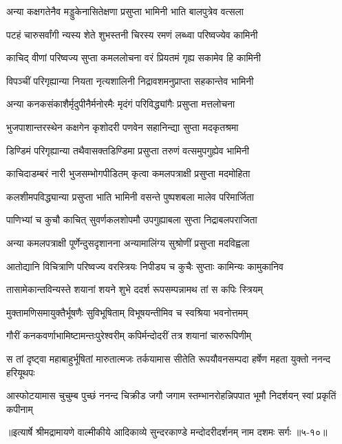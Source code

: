 \twolineshloka
{अन्या कक्षगतेनैव मड्डुकेनासितेक्षणा}
{प्रसुप्ता भामिनी भाति बालपुत्रेव वत्सला} %

\twolineshloka
{पटहं चारुसर्वांगी न्यस्य शेते शुभस्तनी}
{चिरस्य रमणं लब्ध्वा परिष्वज्येव कामिनी} %

\twolineshloka
{काचिद् वीणां परिष्वज्य सुप्ता कमललोचना}
{वरं प्रियतमं गृह्य सकामेव हि कामिनी} %

\twolineshloka
{विपञ्चीं परिगृह्यान्या नियता नृत्यशालिनी}
{निद्रावशमनुप्राप्ता सहकान्तेव भामिनी} %

\twolineshloka
{अन्या कनकसंकाशैर्मृदुपीनैर्मनोरमैः}
{मृदंगं परिविद्ध्यांगैः प्रसुप्ता मत्तलोचना} %

\twolineshloka
{भुजपाशान्तरस्थेन कक्षगेन कृशोदरी}
{पणवेन सहानिन्द्या सुप्ता मदकृतश्रमा} %

\twolineshloka
{डिण्डिमं परिगृह्यान्या तथैवासक्तडिण्डिमा}
{प्रसुप्ता तरुणं वत्समुपगुह्येव भामिनी} %

\twolineshloka
{काचिदाडम्बरं नारी भुजसम्भोगपीडितम्}
{कृत्वा कमलपत्राक्षी प्रसुप्ता मदमोहिता} %

\twolineshloka
{कलशीमपविद्ध्यान्या प्रसुप्ता भाति भामिनी}
{वसन्ते पुष्पशबला मालेव परिमार्जिता} %

\twolineshloka
{पाणिभ्यां च कुचौ काचित् सुवर्णकलशोपमौ}
{उपगुह्याबला सुप्ता निद्राबलपराजिता} %

\twolineshloka
{अन्या कमलपत्राक्षी पूर्णेन्दुसदृशानना}
{अन्यामालिंग्य सुश्रोणीं प्रसुप्ता मदविह्वला} %

\twolineshloka
{आतोद्यानि विचित्राणि परिष्वज्य वरस्त्रियः}
{निपीड्य च कुचैः सुप्ताः कामिन्यः कामुकानिव} %

\twolineshloka
{तासामेकान्तविन्यस्ते शयानां शयने शुभे}
{ददर्श रूपसम्पन्नामथ तां स कपिः स्त्रियम्} %

\twolineshloka
{मुक्तामणिसमायुक्तैर्भूषणैः सुविभूषिताम्}
{विभूषयन्तीमिव च स्वश्रिया भवनोत्तमम्} %

\twolineshloka
{गौरीं कनकवर्णाभामिष्टामन्तःपुरेश्वरीम्}
{कपिर्मन्दोदरीं तत्र शयानां चारुरूपिणीम्} %

\threelineshloka
{स तां दृष्ट्वा महाबाहुर्भूषितां मारुतात्मजः}
{तर्कयामास सीतेति रूपयौवनसम्पदा}
{हर्षेण महता युक्तो ननन्द हरियूथपः} %

\twolineshloka
{आस्फोटयामास चुचुम्ब पुच्छं ननन्द चिक्रीड जगौ जगाम}
{स्तम्भानरोहन्निपपात भूमौ निदर्शयन् स्वां प्रकृतिं कपीनाम्} %


॥इत्यार्षे श्रीमद्रामायणे वाल्मीकीये आदिकाव्ये सुन्दरकाण्डे मन्दोदरीदर्शनम् नाम दशमः सर्गः ॥५-१०॥
